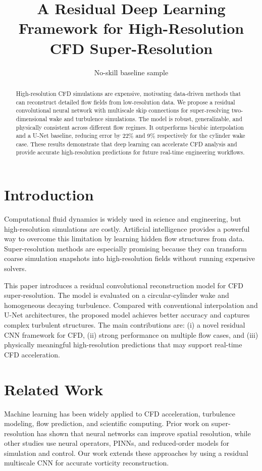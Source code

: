 \documentclass[11pt]{article}
\title{A Residual Deep Learning Framework for High-Resolution CFD Super-Resolution}
\author{No-skill baseline sample}
\date{}
\begin{document}
\maketitle
\begin{abstract}
High-resolution CFD simulations are expensive, motivating data-driven methods that can reconstruct detailed flow fields from low-resolution data. We propose a residual convolutional neural network with multiscale skip connections for super-resolving two-dimensional wake and turbulence simulations. The model is robust, generalizable, and physically consistent across different flow regimes. It outperforms bicubic interpolation and a U-Net baseline, reducing error by 22\% and 9\% respectively for the cylinder wake case. These results demonstrate that deep learning can accelerate CFD analysis and provide accurate high-resolution predictions for future real-time engineering workflows.
\end{abstract}

\section{Introduction}
Computational fluid dynamics is widely used in science and engineering, but high-resolution simulations are costly. Artificial intelligence provides a powerful way to overcome this limitation by learning hidden flow structures from data. Super-resolution methods are especially promising because they can transform coarse simulation snapshots into high-resolution fields without running expensive solvers.

This paper introduces a residual convolutional reconstruction model for CFD super-resolution. The model is evaluated on a circular-cylinder wake and homogeneous decaying turbulence. Compared with conventional interpolation and U-Net architectures, the proposed model achieves better accuracy and captures complex turbulent structures. The main contributions are: (i) a novel residual CNN framework for CFD, (ii) strong performance on multiple flow cases, and (iii) physically meaningful high-resolution predictions that may support real-time CFD acceleration.

\section{Related Work}
Machine learning has been widely applied to CFD acceleration, turbulence modeling, flow prediction, and scientific computing. Prior work on super-resolution has shown that neural networks can improve spatial resolution, while other studies use neural operators, PINNs, and reduced-order models for simulation and control. Our work extends these approaches by using a residual multiscale CNN for accurate vorticity reconstruction.
\end{document}
